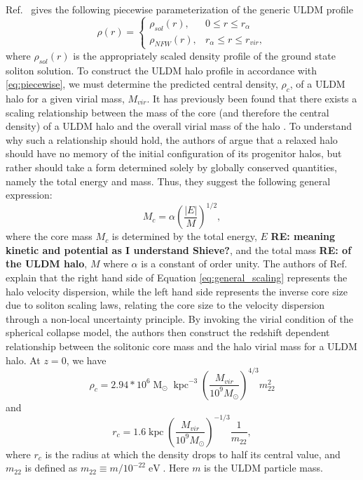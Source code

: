 \documentclass[a4paper,11pt]{article}
\newcommand{\re}[1]{{{\bf \color{green} RE: #1}}}
\begin{document}
Ref.~\cite{Robles:2018fur} gives the following piecewise parameterization of the generic ULDM profile 
%
\begin{equation}\label{eq:piecewise}
     \rho(r)=
    \begin{cases}
      \rho_{sol}(r), & 0\leq r \leq r_{\alpha} \\
      \rho_{NFW}(r), & r_{\alpha}\leq r \leq r_{vir},
    \end{cases}
\end{equation}
%
where $\rho_{sol}(r)$ is the appropriately scaled density profile of the ground state soliton solution. 
To construct the ULDM halo profile in accordance with \ref{eq:piecewise}, we must determine the predicted central density, $\rho_c$, of a ULDM halo for a given virial mass, $M_{vir}$.  It has previously been found that there exists a scaling relationship between the mass of the core (and therefore the central density) of a ULDM halo and the overall virial mass of the halo \cite{Schive:2014hza}. To understand why such a relationship should hold, the authors of \cite{Schive:2014hza} argue that a relaxed halo should have no memory of the initial configuration of its progenitor halos, but rather should take a form determined solely by globally conserved quantities, namely the total energy and mass. Thus, they suggest the following general expression:
\begin{equation}\label{eq:general_scaling}
    M_c = \alpha \left(\frac{\vert E\vert}{M}\right)^{1/2},
\end{equation}
where the core mass $M_c$ is determined by the total energy, $E$ \re{meaning kinetic and potential as I understand Shieve?}, and the total mass \re{ of the ULDM halo}, $M$ where $\alpha$ is a constant of order unity. The authors  of Ref.~\cite{Schive:2014hza} explain that the right hand side of Equation \ref{eq:general_scaling} represents the halo velocity dispersion, while the left hand side  represents the inverse core size  due to soliton scaling laws, relating the core size to the velocity dispersion through a non-local uncertainty principle. By invoking the virial condition of the spherical collapse model, the authors then  construct the redshift dependent relationship between the solitonic core mass and the halo virial mass for a ULDM halo. At $z = 0$, we have  
\begin{equation}\label{eq:central_dens}
    \rho_c = 2.94*10^6 \operatorname{M}_{\odot}\operatorname{kpc}^{-3}\left(\frac{M_{vir}}{10^9 M_{\odot}}\right)^{4/3}m_{22}^{2}
\end{equation}
and 
\begin{equation}
    r_c = 1.6 \operatorname{kpc}\left(\frac{M_{vir}}{10^9 M_{\odot}}\right)^{-1/3}\frac{1}{m_{22}},
\end{equation}
where $r_c$ is the radius at which the density drops to half its central value, and $m_{22}$ is defined as $m_{22} \equiv m / 10^{-22} \operatorname{eV}$. Here $m$ is the ULDM particle mass. 
\end{document}
